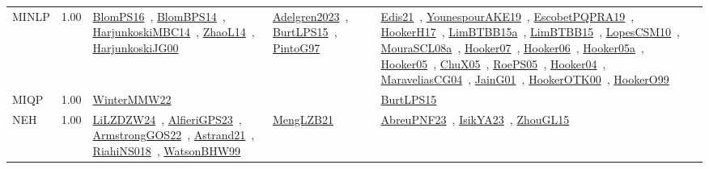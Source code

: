 {\begin{longtable}{p{3cm}r>{\raggedright\arraybackslash}p{6cm}>{\raggedright\arraybackslash}p{6cm}>{\raggedright\arraybackslash}p{8cm}}
\index{MINLP}\index{Algorithms!MINLP}MINLP &  1.00 & \href{../works/BlomPS16.pdf}{BlomPS16}~\cite{BlomPS16}, \href{../works/BlomBPS14.pdf}{BlomBPS14}~\cite{BlomBPS14}, \href{../works/HarjunkoskiMBC14.pdf}{HarjunkoskiMBC14}~\cite{HarjunkoskiMBC14}, \href{../works/ZhaoL14.pdf}{ZhaoL14}~\cite{ZhaoL14}, \href{../works/HarjunkoskiJG00.pdf}{HarjunkoskiJG00}~\cite{HarjunkoskiJG00} & \href{../works/Adelgren2023.pdf}{Adelgren2023}~\cite{Adelgren2023}, \href{../works/BurtLPS15.pdf}{BurtLPS15}~\cite{BurtLPS15}, \href{../works/PintoG97.pdf}{PintoG97}~\cite{PintoG97} & \href{../works/Edis21.pdf}{Edis21}~\cite{Edis21}, \href{../works/YounespourAKE19.pdf}{YounespourAKE19}~\cite{YounespourAKE19}, \href{../works/EscobetPQPRA19.pdf}{EscobetPQPRA19}~\cite{EscobetPQPRA19}, \href{../works/HookerH17.pdf}{HookerH17}~\cite{HookerH17}, \href{../works/LimBTBB15a.pdf}{LimBTBB15a}~\cite{LimBTBB15a}, \href{../works/LimBTBB15.pdf}{LimBTBB15}~\cite{LimBTBB15}, \href{../works/LopesCSM10.pdf}{LopesCSM10}~\cite{LopesCSM10}, \href{../works/MouraSCL08a.pdf}{MouraSCL08a}~\cite{MouraSCL08a}, \href{../works/Hooker07.pdf}{Hooker07}~\cite{Hooker07}, \href{../works/Hooker06.pdf}{Hooker06}~\cite{Hooker06}, \href{../works/Hooker05a.pdf}{Hooker05a}~\cite{Hooker05a}, \href{../works/Hooker05.pdf}{Hooker05}~\cite{Hooker05}, \href{../works/ChuX05.pdf}{ChuX05}~\cite{ChuX05}, \href{../works/RoePS05.pdf}{RoePS05}~\cite{RoePS05}, \href{../works/Hooker04.pdf}{Hooker04}~\cite{Hooker04}, \href{../works/MaraveliasCG04.pdf}{MaraveliasCG04}~\cite{MaraveliasCG04}, \href{../works/JainG01.pdf}{JainG01}~\cite{JainG01}, \href{../works/HookerOTK00.pdf}{HookerOTK00}~\cite{HookerOTK00}, \href{../works/HookerO99.pdf}{HookerO99}~\cite{HookerO99}\\
\index{MIQP}\index{Algorithms!MIQP}MIQP &  1.00 & \href{../works/WinterMMW22.pdf}{WinterMMW22}~\cite{WinterMMW22} &  & \href{../works/BurtLPS15.pdf}{BurtLPS15}~\cite{BurtLPS15}\\
\index{NEH}\index{Algorithms!NEH}NEH &  1.00 & \href{../works/LiLZDZW24.pdf}{LiLZDZW24}~\cite{LiLZDZW24}, \href{../works/AlfieriGPS23.pdf}{AlfieriGPS23}~\cite{AlfieriGPS23}, \href{../works/ArmstrongGOS22.pdf}{ArmstrongGOS22}~\cite{ArmstrongGOS22}, \href{../works/Astrand21.pdf}{Astrand21}~\cite{Astrand21}, \href{../works/RiahiNS018.pdf}{RiahiNS018}~\cite{RiahiNS018}, \href{../works/WatsonBHW99.pdf}{WatsonBHW99}~\cite{WatsonBHW99} & \href{../works/MengLZB21.pdf}{MengLZB21}~\cite{MengLZB21} & \href{../works/AbreuPNF23.pdf}{AbreuPNF23}~\cite{AbreuPNF23}, \href{../works/IsikYA23.pdf}{IsikYA23}~\cite{IsikYA23}, \href{../works/ZhouGL15.pdf}{ZhouGL15}~\cite{ZhouGL15}\\

\end{longtable}}
